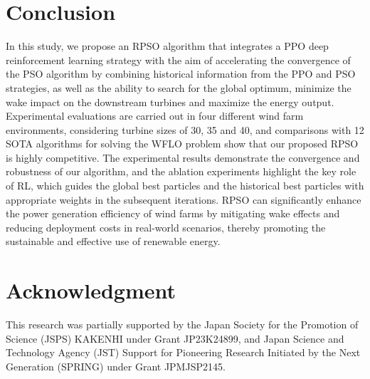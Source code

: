 \documentclass[review]{elsarticle}
\begin{document}
\section{Conclusion}\label{conclusion}
In this study, we propose an RPSO algorithm that integrates a PPO deep reinforcement learning strategy with the aim of accelerating the convergence of the PSO algorithm by combining historical information from the PPO and PSO strategies, as well as the ability to search for the global optimum, minimize the wake impact on the downstream turbines and maximize the energy output. Experimental evaluations are carried out in four different wind farm environments, considering turbine sizes of 30, 35 and 40, and comparisons with 12 SOTA algorithms for solving the WFLO problem show that our proposed RPSO is highly competitive. The experimental results demonstrate the convergence and robustness of our algorithm, and the ablation experiments highlight the key role of RL, which guides the global best particles and the historical best particles with appropriate weights in the subsequent iterations. RPSO can significantly enhance the power generation efficiency of wind farms by mitigating wake effects and reducing deployment costs in real-world scenarios, thereby promoting the sustainable and effective use of renewable energy.

\section*{Acknowledgment}
This research was partially supported by the Japan Society for the Promotion of Science (JSPS) KAKENHI under Grant JP23K24899, and Japan Science and Technology Agency (JST) Support for Pioneering Research Initiated by the Next Generation (SPRING) under Grant JPMJSP2145.



\end{document}
